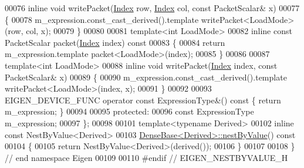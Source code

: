 \begin{DoxyCode}
00076     \textcolor{keyword}{inline} \textcolor{keywordtype}{void} writePacket(\hyperlink{namespace_eigen_a62e77e0933482dafde8fe197d9a2cfde}{Index} row, \hyperlink{namespace_eigen_a62e77e0933482dafde8fe197d9a2cfde}{Index} col, \textcolor{keyword}{const} PacketScalar& x)
00077     \{
00078       m\_expression.const\_cast\_derived().template writePacket<LoadMode>(row, col, x);
00079     \}
00080 
00081     \textcolor{keyword}{template}<\textcolor{keywordtype}{int} LoadMode>
00082     \textcolor{keyword}{inline} \textcolor{keyword}{const} PacketScalar packet(\hyperlink{namespace_eigen_a62e77e0933482dafde8fe197d9a2cfde}{Index} index)\textcolor{keyword}{ const}
00083 \textcolor{keyword}{    }\{
00084       \textcolor{keywordflow}{return} m\_expression.template packet<LoadMode>(index);
00085     \}
00086 
00087     \textcolor{keyword}{template}<\textcolor{keywordtype}{int} LoadMode>
00088     \textcolor{keyword}{inline} \textcolor{keywordtype}{void} writePacket(\hyperlink{namespace_eigen_a62e77e0933482dafde8fe197d9a2cfde}{Index} index, \textcolor{keyword}{const} PacketScalar& x)
00089     \{
00090       m\_expression.const\_cast\_derived().template writePacket<LoadMode>(index, x);
00091     \}
00092 
00093     EIGEN\_DEVICE\_FUNC \textcolor{keyword}{operator} \textcolor{keyword}{const} ExpressionType&() \textcolor{keyword}{const} \{ \textcolor{keywordflow}{return} m\_expression; \}
00094 
00095   \textcolor{keyword}{protected}:
00096     \textcolor{keyword}{const} ExpressionType m\_expression;
00097 \};
00098 
00101 \textcolor{keyword}{template}<\textcolor{keyword}{typename} Derived>
00102 \textcolor{keyword}{inline} \textcolor{keyword}{const} NestByValue<Derived>
00103 \hyperlink{group___core___module_a3e2761e2b6da74dba1d17b40cc918bf7}{DenseBase<Derived>::nestByValue}()\textcolor{keyword}{ const}
00104 \textcolor{keyword}{}\{
00105   \textcolor{keywordflow}{return} NestByValue<Derived>(derived());
00106 \}
00107 
00108 \} \textcolor{comment}{// end namespace Eigen}
00109 
00110 \textcolor{preprocessor}{#endif // EIGEN\_NESTBYVALUE\_H}
\end{DoxyCode}
